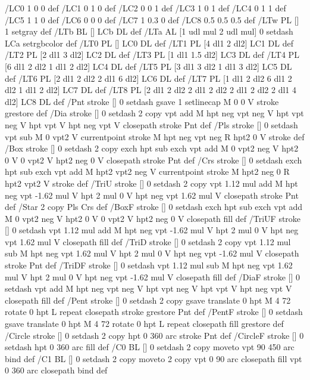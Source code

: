 /LC0 {1 0 0} def
/LC1 {0 1 0} def
/LC2 {0 0 1} def
/LC3 {1 0 1} def
/LC4 {0 1 1} def
/LC5 {1 1 0} def
/LC6 {0 0 0} def
/LC7 {1 0.3 0} def
/LC8 {0.5 0.5 0.5} def
/LTw {PL [] 1 setgray} def
/LTb {BL [] LCb DL} def
/LTa {AL [1 udl mul 2 udl mul] 0 setdash LCa setrgbcolor} def
/LT0 {PL [] LC0 DL} def
/LT1 {PL [4 dl1 2 dl2] LC1 DL} def
/LT2 {PL [2 dl1 3 dl2] LC2 DL} def
/LT3 {PL [1 dl1 1.5 dl2] LC3 DL} def
/LT4 {PL [6 dl1 2 dl2 1 dl1 2 dl2] LC4 DL} def
/LT5 {PL [3 dl1 3 dl2 1 dl1 3 dl2] LC5 DL} def
/LT6 {PL [2 dl1 2 dl2 2 dl1 6 dl2] LC6 DL} def
/LT7 {PL [1 dl1 2 dl2 6 dl1 2 dl2 1 dl1 2 dl2] LC7 DL} def
/LT8 {PL [2 dl1 2 dl2 2 dl1 2 dl2 2 dl1 2 dl2 2 dl1 4 dl2] LC8 DL} def
/Pnt {stroke [] 0 setdash gsave 1 setlinecap M 0 0 V stroke grestore} def
/Dia {stroke [] 0 setdash 2 copy vpt add M
  hpt neg vpt neg V hpt vpt neg V
  hpt vpt V hpt neg vpt V closepath stroke
  Pnt} def
/Pls {stroke [] 0 setdash vpt sub M 0 vpt2 V
  currentpoint stroke M
  hpt neg vpt neg R hpt2 0 V stroke
 } def
/Box {stroke [] 0 setdash 2 copy exch hpt sub exch vpt add M
  0 vpt2 neg V hpt2 0 V 0 vpt2 V
  hpt2 neg 0 V closepath stroke
  Pnt} def
/Crs {stroke [] 0 setdash exch hpt sub exch vpt add M
  hpt2 vpt2 neg V currentpoint stroke M
  hpt2 neg 0 R hpt2 vpt2 V stroke} def
/TriU {stroke [] 0 setdash 2 copy vpt 1.12 mul add M
  hpt neg vpt -1.62 mul V
  hpt 2 mul 0 V
  hpt neg vpt 1.62 mul V closepath stroke
  Pnt} def
/Star {2 copy Pls Crs} def
/BoxF {stroke [] 0 setdash exch hpt sub exch vpt add M
  0 vpt2 neg V hpt2 0 V 0 vpt2 V
  hpt2 neg 0 V closepath fill} def
/TriUF {stroke [] 0 setdash vpt 1.12 mul add M
  hpt neg vpt -1.62 mul V
  hpt 2 mul 0 V
  hpt neg vpt 1.62 mul V closepath fill} def
/TriD {stroke [] 0 setdash 2 copy vpt 1.12 mul sub M
  hpt neg vpt 1.62 mul V
  hpt 2 mul 0 V
  hpt neg vpt -1.62 mul V closepath stroke
  Pnt} def
/TriDF {stroke [] 0 setdash vpt 1.12 mul sub M
  hpt neg vpt 1.62 mul V
  hpt 2 mul 0 V
  hpt neg vpt -1.62 mul V closepath fill} def
/DiaF {stroke [] 0 setdash vpt add M
  hpt neg vpt neg V hpt vpt neg V
  hpt vpt V hpt neg vpt V closepath fill} def
/Pent {stroke [] 0 setdash 2 copy gsave
  translate 0 hpt M 4 {72 rotate 0 hpt L} repeat
  closepath stroke grestore Pnt} def
/PentF {stroke [] 0 setdash gsave
  translate 0 hpt M 4 {72 rotate 0 hpt L} repeat
  closepath fill grestore} def
/Circle {stroke [] 0 setdash 2 copy
  hpt 0 360 arc stroke Pnt} def
/CircleF {stroke [] 0 setdash hpt 0 360 arc fill} def
/C0 {BL [] 0 setdash 2 copy moveto vpt 90 450 arc} bind def
/C1 {BL [] 0 setdash 2 copy moveto
	2 copy vpt 0 90 arc closepath fill
	vpt 0 360 arc closepath} bind def
